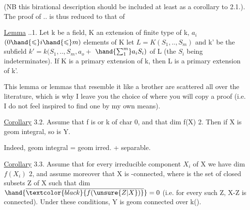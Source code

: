 
(NB this birational description should be included at least
as a corollary to 2.1.). The proof of .. is thus reduced to
that of

\uline{Lemma} ..1.  Let k be a field, K an extension of finite type of k, 
$a_i$ $(0\hand{\leqslant} i\hand{\leqslant} m)$ elements of K  
 let $L = K(S_1,..,S_m)$ and k' be the subfield $k'= k(S_1,..,S_m,a_o +$
$\hand{\sum_{1}^{m}}a_iS_i)$ of L (the $S_i$ being indeterminates). \hand{,} If K is a
primary extension of k, then L is a primary extension of k'.

 This lemma\hand{,} or lemmas that resemble it like a brother\hand{,} are
scattered all over the literature, which is why I leave you the
choice of where you will copy a proof (i.e. I do not feel
inspired to find one by my own means).

\uline{Corollary} 3.2. Assume that f is   or k of char 0,
and that dim f(X) 2. Then if X is geom integral, so is
Y\hand{$_\eta$}.

Indeed, geom integral = geom irred. + separable.

\uline{Corollary} 3.3. Assume  that for every irreducible component $X_i$
of X we have dim $f(X_i)$ 2, and assume moreover that X is -connected,
where  is the set of closed subsets Z of X such that dim $\hand{\overline{\textcolor{black}{f(\unsure{Z|X})}}}=0$
(i.e. for every such Z, X-Z is connected). Under these conditions, Y\hand{$_\eta$} is
geom connected over k(\hand{$\eta$}).


